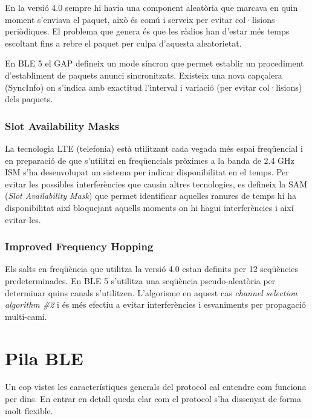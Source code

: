 En la versió 4.0 sempre hi havia una component aleatòria que marcava en quin moment s'enviava el paquet, això és comú i serveix per evitar col·lisions periòdiques.
El problema que genera és que les ràdios han d'estar més temps escoltant fins a rebre el paquet per culpa d'aquesta aleatorietat.

En BLE 5 el GAP defineix un mode síncron que permet establir un procediment d'establiment de paquets anunci sincronitzats.
Existeix una nova capçalera (SyncInfo) on s'indica amb exactitud l'interval i variació (per evitar col·lisions) dels paquets.    

\subsubsection{Slot Availability Masks}
La tecnologia LTE (telefonia) està utilitzant cada vegada més espai freqüencial i en preparació de que s'utilitzi en freqüencials pròximes a la banda de 2.4 GHz ISM s'ha desenvolupat un sistema per indicar disponibilitat en el temps.
Per evitar les possibles interferències que causin altres tecnologies, es defineix la SAM (\textit{Slot Availability Mask}) que permet identificar aquelles ranures de temps hi ha disponibilitat així bloquejant aquells moments on hi hagui interferències i així evitar-les.

\subsubsection{Improved Frequency Hopping}
Els salts en freqüència que utilitza la versió 4.0 estan definits per 12 seqüències predeterminades.
En BLE 5 s'utilitza una seqüència pseudo-aleatòria per determinar quins canals s'utilitzen. L'algorisme en aquest cas \textit{channel selection algorithm \#2} i és més efectiu a evitar interferències i esvaniments per propagació multi-camí.

\section{Pila BLE}
Un cop vistes les característiques generals del protocol cal entendre com funciona per dins.
En entrar en detall queda clar com el protocol s'ha dissenyat de forma molt flexible.

